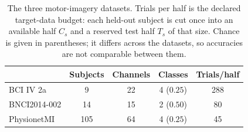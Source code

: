 \begin{table}[b]
\centering
\caption{The three motor-imagery datasets. Trials per half is the declared target-data budget: each held-out subject is cut once into an available half $C_s$ and a reserved test half $T_s$ of that size. Chance is given in parentheses; it differs across the datasets, so accuracies are not comparable between them.}
\label{tab:datasets}
\small
\setlength{\tabcolsep}{4pt}
\begin{tabular}{@{}lcccc@{}}
\toprule
& Subjects & Channels & Classes & Trials/half \\
\midrule
BCI IV 2a \cite{tangermann2012bcicompiv} & 9 & 22 & 4 ($0.25$) & 288 \\
BNCI2014-002 \cite{steyrl2016bnci} & 14 & 15 & 2 ($0.50$) & 80 \\
PhysionetMI \cite{schalk2004bci2000,goldberger2000physionet} & 105 & 64 & 4 ($0.25$) & 45 \\
\bottomrule
\end{tabular}
\end{table}
